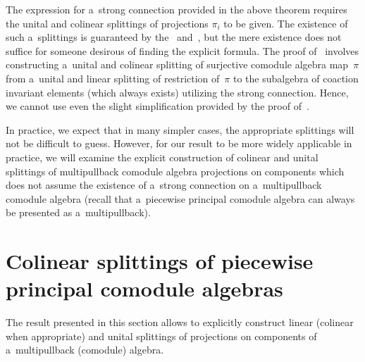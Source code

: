\documentclass[pdftex]{sigma}
\begin{document}
The expression for a~strong connection provided in the above theorem requires the unital and colinear splittings of
projections $\pi_i$ to be given.
The existence of such a~splittings is guaranteed by the~\cite[Lemma~3.1]{hkmz11} and~\cite[Theorem~3.3]{hkmz11}, but the
mere existence does not suf\/f\/ice for someone desirous of f\/inding the explicit formula.
The proof of~\cite[Lemma~3.1]{hkmz11} involves constructing a~unital and colinear splitting of surjective comodule
algebra map~$\pi$ from a~unital and linear splitting of restriction of~$\pi$ to the subalgebra of coaction invariant
elements (which always exists) utilizing the strong connection.
Hence, we cannot use even the slight simplif\/ication provided by the proof of~\cite[Lemma~3.1]{hkmz11}.

In practice, we expect that in many simpler cases, the appropriate splittings will not be dif\/f\/icult to guess.
However, for our result to be more widely applicable in practice, we will examine the explicit construction of colinear
and unital splittings of multipullback comodule algebra projections on components which does not assume the existence of
a~strong connection on a~multipullback comodule algebra (recall that a~piecewise principal comodule algebra can always
be presented as a~multipullback).

\section{Colinear splittings of piecewise principal comodule algebras}\label{colinear-section}

The result presented in this section allows to explicitly construct linear (colinear when approp\-riate) and unital
splittings of projections on components of a~multipullback (comodule) algebra.
\end{document}
